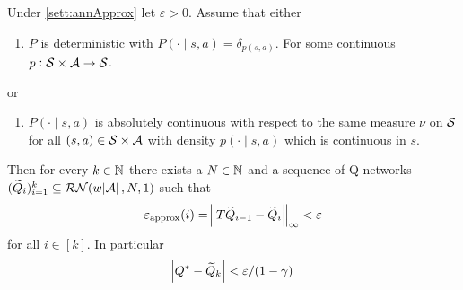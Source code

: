\begin{prop}
  Under \cref{sett:annApprox} let $\varepsilon > 0$.
  Assume that either
  \begin{enumerate}
    \item $P$ is deterministic with $P(\cdot \mid s, a) = \delta_{p(s, a)}$.
      For some continuous $p: \mathcal{S} \times \mathcal{A} \to \mathcal{S}$.
  \end{enumerate}

  or
  \begin{enumerate}[resume]
    \item $P(\cdot \mid s, a)$ is absolutely continuous
      with respect to the same measure $\nu$ on $\mathcal{S}$ for all
      $(s, a) \in \mathcal{S} \times \mathcal{A}$ with density
      $p(\cdot \mid s, a)$ which is continuous in $s$.
  \end{enumerate}
  Then for every $k \in \mathbb{N}$ there exists a $N\in \mathbb{N}$ and a sequence of
  Q-networks $(\widetilde{Q}_i)_{i=1}^k \subseteq \mathcal{RN}(w \abs{\mathcal{A}}, N, 1)$
  such that
  \[ \varepsilon_{\mathrm{approx}}(i) = \norm{T\widetilde{Q}_{i-1} - \widetilde{Q}_i}_\infty < \varepsilon \]
  for all $i \in [k]$.
  In particular
  \[ \abs{Q^* - \widetilde{Q}_k} < \varepsilon/(1 - \gamma) \]
\end{prop}
